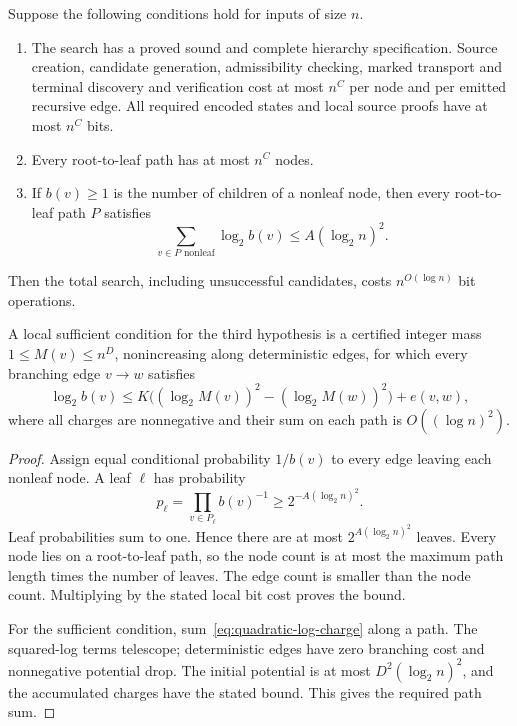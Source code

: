 \begin{proposition}
\label{prop:entropy-search}
Suppose the following conditions hold for inputs of size $n$.
\begin{enumerate}
\item The search has a proved sound and complete hierarchy specification.
      Source creation, candidate generation, admissibility checking,
      marked transport and terminal discovery and verification cost at most $n^C$
      per node and per emitted recursive edge.  All required encoded
      states and local source proofs have at most $n^C$ bits.
\item Every root-to-leaf path has at most $n^C$ nodes.
\item If $b(v)\geq1$ is the number of children of a nonleaf node, then
      every root-to-leaf path $P$ satisfies
      \[
         \sum_{v\in P\text{ nonleaf}}\log_2 b(v)
                      \leq A(\log_2 n)^2.
      \]
\end{enumerate}
Then the total search, including unsuccessful candidates, costs
$n^{O(\log n)}$ bit operations.

A local sufficient condition for the third hypothesis is a certified
integer mass $1\leq M(v)\leq n^D$, nonincreasing along deterministic
edges, for which every branching edge $v\to w$ satisfies
\begin{equation}
 \log_2 b(v)\leq
 K\bigl((\log_2 M(v))^2-(\log_2 M(w))^2\bigr)+e(v,w),
 \label{eq:quadratic-log-charge}
\end{equation}
where all charges are nonnegative and their sum on each path is
$O((\log n)^2)$.
\end{proposition}
\begin{proof}
Assign equal conditional probability $1/b(v)$ to every edge leaving
each nonleaf node.  A leaf $\ell$ has probability
\[
 p_\ell=\prod_{v\in P_\ell}b(v)^{-1}\geq
             2^{-A(\log_2 n)^2}.
\]
Leaf probabilities sum to one.  Hence there are at most
$2^{A(\log_2 n)^2}$ leaves.  Every node lies on a root-to-leaf path, so
the node count is at most the maximum path length times the number of
leaves.  The edge count is smaller than the node count.  Multiplying by
the stated local bit cost proves the bound.

For the sufficient condition, sum~\eqref{eq:quadratic-log-charge} along
a path.  The squared-log terms telescope; deterministic edges have zero
branching cost and nonnegative potential drop.  The initial potential
is at most $D^2(\log_2 n)^2$, and the accumulated charges have the stated
bound.  This gives the required path sum.
\end{proof}

